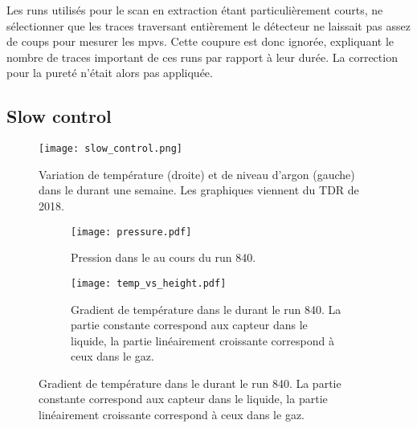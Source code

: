       Les runs utilisés pour le scan en extraction étant particulièrement courts, ne sélectionner que les traces traversant entièrement le détecteur ne laissait pas assez de coups pour mesurer les \glspl{mpv}. Cette coupure est donc ignorée, expliquant le nombre de traces  important de ces runs par rapport à leur durée. La correction pour la pureté n'était alors pas appliquée.

    \subsection{Slow control}\label{sec::slow_control}

      \begin{figure}[htbp]
        \centering
        \texttt{[image: slow\_control.png]}
        \caption[Variation de température et de niveau d'argon dans le \TOO{}.]{\label{fig::slow_control}Variation de température (droite) et de niveau d'argon (gauche) dans le \TOO{} durant une semaine. Les graphiques viennent du TDR de 2018\cite{Aimard2018}.}
      \end{figure}

      \begin{figure}[htbp]
        \centering
        \begin{subfigure}[t]{0.48\textwidth}
          \centering
          \texttt{[image: pressure.pdf]}
          \caption[Pression dans le \TOO{} au cours du run 840.]{\label{fig::pressure}Pression dans le \TOO{} au cours du run 840.}
        \end{subfigure}\hfill
        \begin{subfigure}[t]{0.48\textwidth}
          \centering
          \texttt{[image: temp\_vs\_height.pdf]}
          \caption[Gradient de température dans le \TOO{} durant le run 840.]{\label{fig::temp_vs_height}Gradient de température dans le \TOO{} durant le run 840. La partie constante correspond aux capteur dans le liquide, la partie linéairement croissante correspond à ceux dans le gaz.}
        \end{subfigure}
      \end{figure}
      
